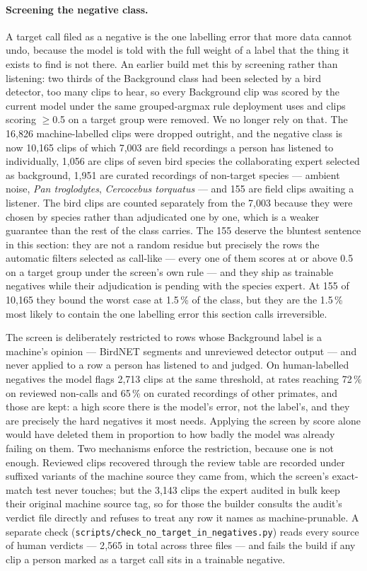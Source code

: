 \documentclass[review,3p,times]{elsarticle}
\begin{document}
\paragraph{Screening the negative class.} A target call filed as a negative is
the one labelling error that more data cannot undo, because the model is told
with the full weight of a label that the thing it exists to find is not there.
An earlier build met this by screening rather than listening: two thirds of the
Background class had been selected by a bird detector, too many clips to hear,
so every Background clip was scored by the current model under the same
grouped-argmax rule deployment uses and clips scoring $\ge$0.5 on a target group
were removed. We no longer rely on that. The 16{,}826 machine-labelled clips
were dropped outright, and the negative class is now 10{,}165 clips of which
7{,}003 are field recordings a person has listened to individually, 1{,}056 are
clips of seven bird species the collaborating expert selected as background,
1{,}951 are curated recordings of non-target species --- ambient noise,
\textit{Pan troglodytes}, \textit{Cercocebus torquatus} --- and 155 are field
clips awaiting a listener. The bird clips are counted separately from the
7{,}003 because they were chosen by species rather than adjudicated one by one,
which is a weaker guarantee than the rest of the class carries. The 155 deserve
the bluntest sentence in this section: they are not a random residue but
precisely the rows the automatic filters selected as call-like --- every one
of them scores at or above 0.5 on a target group under the screen's own rule
--- and they ship as trainable negatives while their adjudication is pending
with the species expert. At 155 of 10{,}165 they bound the worst case at
1.5\,\% of the class, but they are the 1.5\,\% most likely to contain the one
labelling error this section calls irreversible.

The screen is deliberately restricted to rows whose Background label is a
machine's opinion --- BirdNET segments and unreviewed detector output --- and
never applied to a row a person has listened to and judged. On human-labelled
negatives the model flags 2{,}713 clips at the same threshold, at rates reaching
72\,\% on reviewed non-calls and 65\,\% on curated recordings of other primates,
and those are kept: a high score there is the model's error, not the label's,
and they are precisely the hard negatives it most needs. Applying the screen by
score alone would have deleted them in proportion to how badly the model was
already failing on them. Two mechanisms enforce the restriction, because one is
not enough. Reviewed clips recovered through the review table are recorded
under suffixed variants of the machine source they came from, which the
screen's exact-match test never touches; but the 3{,}143 clips the expert
audited in bulk keep their original machine source tag, so for those the
builder consults the audit's verdict file directly and refuses to treat any
row it names as machine-prunable. A separate check
(\texttt{scripts/check\_no\_target\_in\_negatives.py}) reads every source of
human verdicts --- 2{,}565 in total across three files --- and fails the build
if any clip a person marked as a target call sits in a trainable negative.
\end{document}
